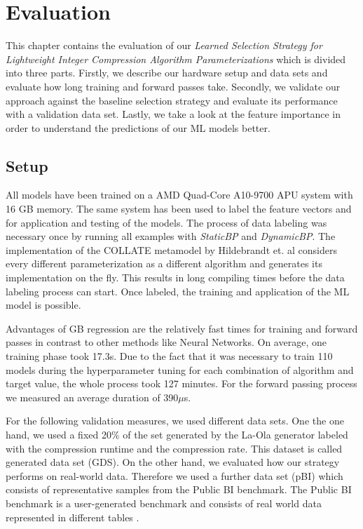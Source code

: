 \chapter{Evaluation}
This chapter contains the evaluation of our \emph{Learned Selection Strategy for Lightweight Integer Compression Algorithm Parameterizations} which is divided into three parts. Firstly, we describe our hardware setup and data sets and evaluate how long training and forward passes take. Secondly, we validate our approach against the baseline selection strategy and evaluate its performance with a validation data set. Lastly, we take a look at the feature importance in order to understand the predictions of our ML models better.
\section{Setup}
All models have been trained on a AMD Quad-Core A10-9700 APU system with 16 GB memory. The same system has been used to label the feature vectors and for application and testing of the models. The process of data labeling was necessary once by running all examples with \emph{StaticBP} and \emph{DynamicBP}. The implementation of the COLLATE metamodel by Hildebrandt et. al \cite{Hildebrandt2017} considers every different parameterization as a different algorithm and generates its implementation on the fly. This results in long compiling times before the data labeling process can start. Once labeled, the training and application of the ML model is possible.

Advantages of GB regression are the relatively fast times for training and forward passes in contrast to other methods like Neural Networks. On average, one training phase took 17.3s. Due to the fact that it was necessary to train 110 models during the hyperparameter tuning for each combination of algorithm and target value, the whole process took 127 minutes. 
For the forward passing process we measured an average duration of 390$\mu$s.

For the following validation measures, we used different data sets.
One the one hand, we used a fixed 20\% of the set generated by the La-Ola generator labeled with the compression runtime and the compression rate. This dataset is called generated data set (GDS).
On the other hand, we evaluated how our strategy performs on real-world data. Therefore we used a further data set (pBI) which consists of representative samples from the Public BI benchmark. The Public BI benchmark is a user-generated benchmark and consists of real world data represented in different tables \cite{Ghit2020}.

